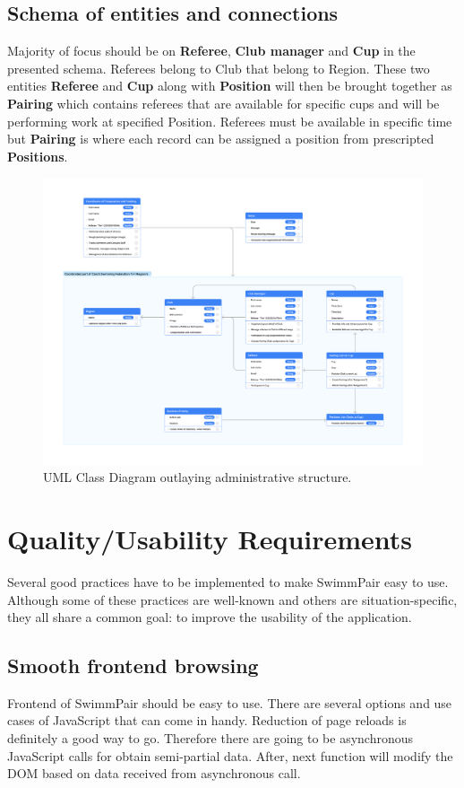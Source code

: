 \subsection*{Schema of entities and connections}
Majority of focus should be on \textbf{Referee}, \textbf{Club manager} and \textbf{Cup} in the presented schema. Referees belong to Club that belong to Region. These two entities \textbf{Referee} and \textbf{Cup} along with \textbf{Position} will then be brought together as \textbf{Pairing} which contains referees that are available for specific cups and will be performing work at specified Position. Referees must be available in specific time but \textbf{Pairing} is where each record can be assigned a position from prescripted \textbf{Positions}.
\begin{figure}[h]
\includegraphics[scale=0.160]{img/swimmpair_uml.png}
  \caption{UML Class Diagram outlaying administrative structure.}
  \label{fig1.2:uml}
\end{figure}

\section{Quality/Usability Requirements}
Several good practices have to be implemented to make SwimmPair easy to use. Although some of these practices are well-known and others are situation-specific, they all share a common goal: to improve the usability of the application.
\subsection*{Smooth frontend browsing}
\par
Frontend of SwimmPair should be easy to use. There are several options and use cases of JavaScript that can come in handy. Reduction of page reloads is definitely a good way to go. Therefore there are going to be asynchronous JavaScript calls for obtain semi-partial data. After, next function will modify the DOM based on data received from asynchronous call. 
